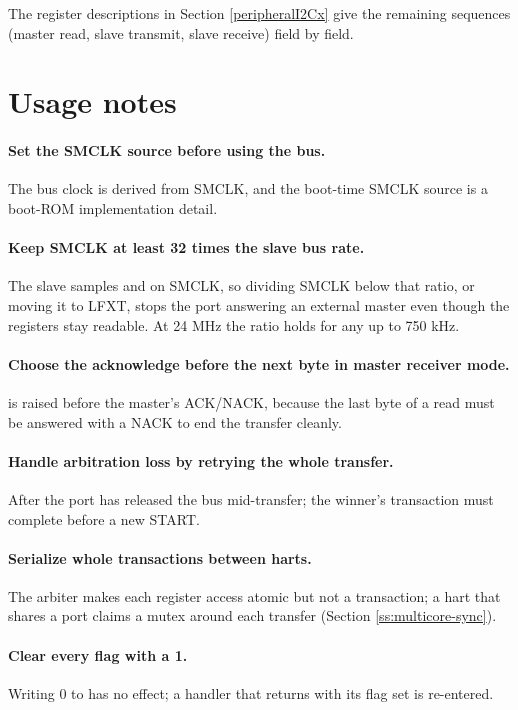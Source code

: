 The register descriptions in Section \ref{peripheralI2Cx} give the remaining sequences (master read, slave transmit, slave receive) field by field.

\section{Usage notes}

\paragraph{Set the SMCLK source before using the bus.} The bus clock is derived from SMCLK, and the boot-time SMCLK source is a boot-ROM implementation detail.

\paragraph{Keep SMCLK at least 32 times the slave bus rate.} The slave samples  and  on SMCLK, so dividing SMCLK below that ratio, or moving it to LFXT, stops the port answering an external master even though the registers stay readable. At 24 MHz the ratio holds for any  up to 750 kHz.

\paragraph{Choose the acknowledge before the next byte in master receiver mode.}  is raised before the master's ACK/NACK, because the last byte of a read must be answered with a NACK to end the transfer cleanly.

\paragraph{Handle arbitration loss by retrying the whole transfer.} After  the port has released the bus mid-transfer; the winner's transaction must complete before a new START.

\paragraph{Serialize whole transactions between harts.} The arbiter makes each register access atomic but not a transaction; a hart that shares a port claims a mutex around each transfer (Section \ref{ss:multicore-sync}).

\paragraph{Clear every flag with a 1.} Writing 0 to  has no effect; a handler that returns with its flag set is re-entered.
